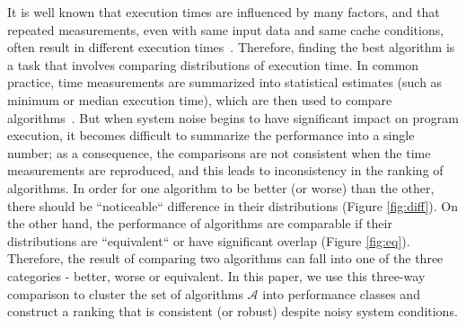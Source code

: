 \documentclass[conference]{IEEEtran}
\begin{document}
It is well known that execution times are influenced by many factors, and that repeated measurements, even with same input data and same cache conditions, often result in different execution times~\cite{peise2014cache,hoefler2010characterizing,peise2012performance}. Therefore, finding the best algorithm is a task that involves comparing distributions of execution time.
%
In common practice, time measurements are summarized into statistical estimates (such as minimum or median execution time), which are then used to compare algorithms~\cite{peise2019elaps}. But when system noise begins to have significant impact on program execution, it becomes difficult to summarize the performance into a single number; as a consequence, the comparisons are not consistent when the time measurements are reproduced, and this leads to inconsistency in the ranking of algorithms.
In order for one algorithm to be better (or worse) than the other, there should be ``noticeable`` difference in their distributions (Figure \ref{fig:diff}). On the other hand, the performance of algorithms are comparable if their distributions are ``equivalent`` or have significant overlap (Figure \ref{fig:eq}). 
%
Therefore, the result of comparing two algorithms can fall into one of the three categories - better, worse or equivalent. 
In this paper, we use this three-way comparison to cluster the set of algorithms $\mathcal{A}$ into performance classes and construct a ranking that is consistent (or robust) despite noisy system conditions. 
%
\end{document}
